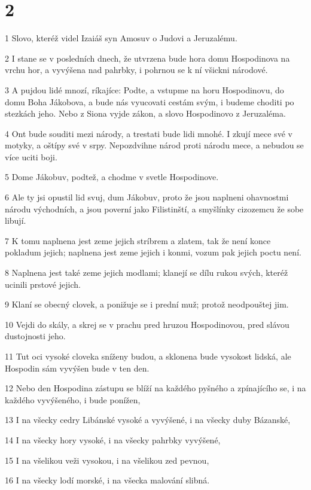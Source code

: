 \chapter{2}

\par 1 Slovo, kteréž videl Izaiáš syn Amosuv o Judovi a Jeruzalému.
\par 2 I stane se v posledních dnech, že utvrzena bude hora domu Hospodinova na vrchu hor, a vyvýšena nad pahrbky, i pohrnou se k ní všickni národové.
\par 3 A pujdou lidé mnozí, ríkajíce: Podte, a vstupme na horu Hospodinovu, do domu Boha Jákobova, a bude nás vyucovati cestám svým, i budeme choditi po stezkách jeho. Nebo z Siona vyjde zákon, a slovo Hospodinovo z Jeruzaléma.
\par 4 Ont bude souditi mezi národy, a trestati bude lidi mnohé. I zkují mece své v motyky, a oštípy své v srpy. Nepozdvihne národ proti národu mece, a nebudou se více uciti boji.
\par 5 Dome Jákobuv, podtež, a chodme v svetle Hospodinove.
\par 6 Ale ty jsi opustil lid svuj, dum Jákobuv, proto že jsou naplneni ohavnostmi národu východních, a jsou poverní jako Filistinští, a smyšlínky cizozemcu že sobe libují.
\par 7 K tomu naplnena jest zeme jejich stríbrem a zlatem, tak že není konce pokladum jejich; naplnena jest zeme jejich i konmi, vozum pak jejich poctu není.
\par 8 Naplnena jest také zeme jejich modlami; klanejí se dílu rukou svých, kteréž ucinili prstové jejich.
\par 9 Klaní se obecný clovek, a ponižuje se i prední muž; protož neodpouštej jim.
\par 10 Vejdi do skály, a skrej se v prachu pred hruzou Hospodinovou, pred slávou dustojnosti jeho.
\par 11 Tut oci vysoké cloveka sníženy budou, a sklonena bude vysokost lidská, ale Hospodin sám vyvýšen bude v ten den.
\par 12 Nebo den Hospodina zástupu se blíží na každého pyšného a zpínajícího se, i na každého vyvýšeného, i bude ponížen,
\par 13 I na všecky cedry Libánské vysoké a vyvýšené, i na všecky duby Bázanské,
\par 14 I na všecky hory vysoké, i na všecky pahrbky vyvýšené,
\par 15 I na všelikou veži vysokou, i na všelikou zed pevnou,
\par 16 I na všecky lodí morské, i na všecka malování slibná.
